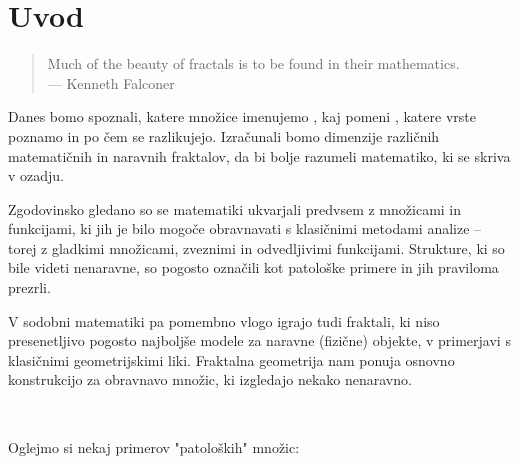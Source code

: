 \section{Uvod}

\begin{quote}
    Much of the beauty of fractals is to be found in their mathematics.\\
\hfill --- Kenneth Falconer
\end{quote}

Danes bomo spoznali, katere množice imenujemo , kaj pomeni , katere vrste poznamo in po čem se razlikujejo. Izračunali bomo dimenzije različnih matematičnih in naravnih fraktalov, da bi bolje razumeli matematiko, ki se skriva v ozadju.

Zgodovinsko gledano so se matematiki ukvarjali predvsem z množicami in funkcijami, ki jih je bilo mogoče obravnavati s klasičnimi metodami analize -- torej z gladkimi množicami, zveznimi in odvedljivimi funkcijami. Strukture, ki so bile videti nenaravne, so pogosto označili kot patološke primere in jih praviloma prezrli.

V sodobni matematiki pa pomembno vlogo igrajo tudi fraktali, ki niso presenetljivo pogosto najboljše modele za naravne (fizične) objekte, v primerjavi s klasičnimi geometrijskimi liki. Fraktalna geometrija nam ponuja osnovno konstrukcijo za obravnavo množic, ki izgledajo nekako nenaravno.

\ 

Oglejmo si nekaj primerov "patoloških" množic:

